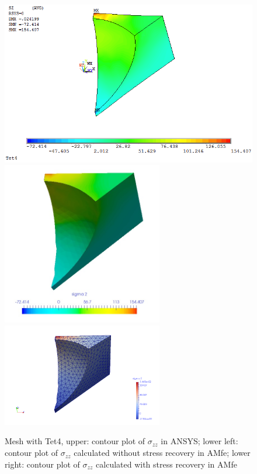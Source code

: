 \begin{figure}[htbp]
	\begin{center}
		\includegraphics[width=13cm,clip]{Tet4Szz.png} 	
		\includegraphics[width=7cm,clip]{Tet4SzzPD.png} 	
		\includegraphics[width=7cm,clip]{Tet4SzzP.png} 		
		\caption{Mesh with Tet4, upper: contour plot of $\sigma_{zz}$ in ANSYS; lower left: contour plot of $\sigma_{zz}$ calculated without stress recovery in AMfe; lower right: contour plot of $\sigma_{zz}$ calculated with stress recovery in AMfe} \label{fig: Tet4_Szz}
	\end{center}
\end{figure}
\clearpage 

